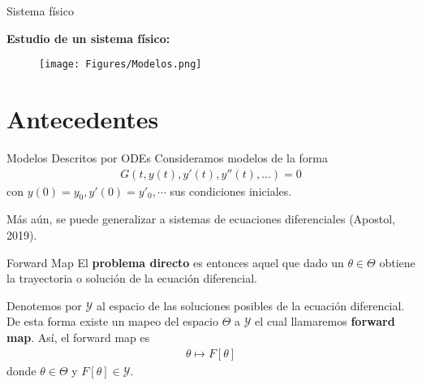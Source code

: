\documentclass[10pt,aspectratio=169]{beamer}
\begin{document}
\begin{frame}[fragile]{Sistema físico}

  \textbf{Estudio de un sistema físico:}
  \begin{figure}[H] 
      \centering 
      \texttt{[image: Figures/Modelos.png]} 
  \end{figure} 

\end{frame}


\section{Antecedentes}

\begin{frame}{Modelos Descritos por ODEs}
  Consideramos modelos de la forma
  \begin{align*}
    G(t,y(t),y'(t),y''(t),...) = 0
  \end{align*}
  con $y(0)=y_0, y'(0)= y'_0, \cdots$ sus condiciones iniciales.

  Más aún, se puede generalizar a sistemas de ecuaciones diferenciales (Apostol, 2019).
\end{frame}


\begin{frame}{Forward Map}
  El \textbf{problema directo} es entonces aquel que dado un $\theta \in \Theta$ obtiene la trayectoria o solución de la ecuación diferencial.

  \vspace{1 cm}
  
  Denotemos por $\mathcal{Y}$ al espacio de las soluciones posibles de la ecuación diferencial. De esta forma existe un mapeo del espacio $\Theta$ a $\mathcal{Y}$ el cual llamaremos \textbf{forward map}. Así, el forward map es 
  \begin{align*}
      \theta \mapsto F[\theta]
  \end{align*}
  donde $\theta \in \Theta$ y $F[\theta] \in \mathcal{Y}$.
\end{frame}
\end{document}
